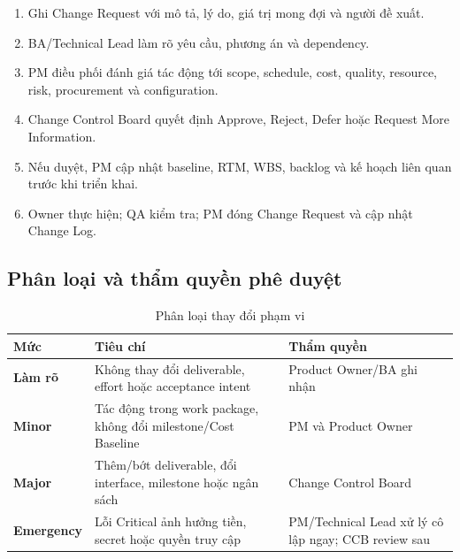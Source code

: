\begin{enumerate}
  \item Ghi Change Request với mô tả, lý do, giá trị mong đợi và người đề xuất.
  \item BA/Technical Lead làm rõ yêu cầu, phương án và dependency.
  \item PM điều phối đánh giá tác động tới scope, schedule, cost, quality, resource, risk, procurement và configuration.
  \item Change Control Board quyết định Approve, Reject, Defer hoặc Request More Information.
  \item Nếu duyệt, PM cập nhật baseline, RTM, WBS, backlog và kế hoạch liên quan trước khi triển khai.
  \item Owner thực hiện; QA kiểm tra; PM đóng Change Request và cập nhật Change Log.
\end{enumerate}


\subsection{Phân loại và thẩm quyền phê duyệt}

\begin{table}[H]
\centering
\caption{Phân loại thay đổi phạm vi}
\label{tab:change-level}
\begin{tabularx}{\textwidth}{| >{\bfseries}p{2.6cm} | p{6cm} | X |}
\hline
Mức & Tiêu chí & Thẩm quyền \\
\hline
Làm rõ & Không thay đổi deliverable, effort hoặc acceptance intent & Product Owner/BA ghi nhận \\ \hline
Minor & Tác động trong work package, không đổi milestone/Cost Baseline & PM và Product Owner \\ \hline
Major & Thêm/bớt deliverable, đổi interface, milestone hoặc ngân sách & Change Control Board \\ \hline
Emergency & Lỗi Critical ảnh hưởng tiền, secret hoặc quyền truy cập & PM/Technical Lead xử lý cô lập ngay; CCB review sau \\
\hline
\end{tabularx}
\end{table}


